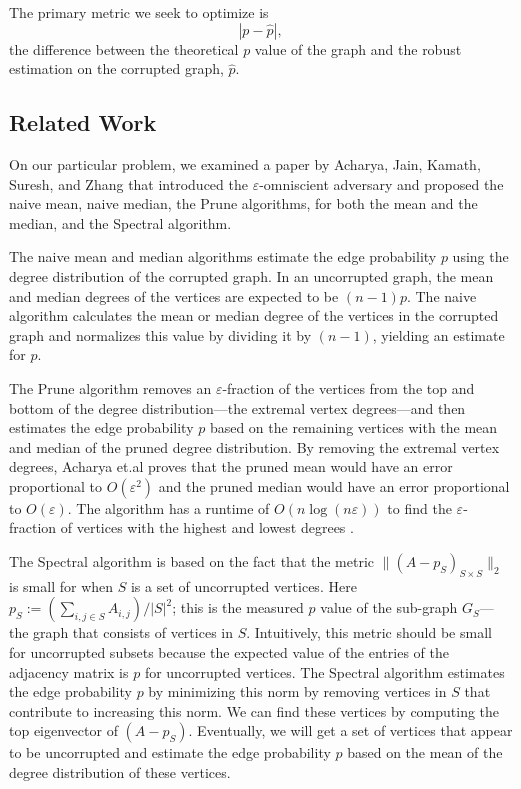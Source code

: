 \documentclass[10pt,onecolumn,letterpaper]{article}
\newcommand{\eps}{\varepsilon}
\begin{document}
The primary metric we seek to optimize is $$|p - \hat p|,$$ the difference between the theoretical $p$ value of the graph and the robust estimation on the corrupted graph, $\hat{p}$.

\subsection{Related Work}

On our particular problem, we examined a paper by Acharya, Jain, Kamath, Suresh, and Zhang \cite{acharya2022robustestimationrandomgraphs} that introduced the $\eps$-omniscient adversary and proposed the naive mean, naive median, the Prune algorithms, for both the mean and the median, and the Spectral algorithm. 

The naive mean and median algorithms estimate the edge probability $p$ using the degree distribution of the corrupted graph. In an uncorrupted graph, the mean and median degrees of the vertices are expected to be $(n-1)p$. The naive algorithm calculates the mean or median degree of the vertices in the corrupted graph and normalizes this value by dividing it by $(n-1)$, yielding an estimate for $p$.

The Prune algorithm removes an $\eps$-fraction of the vertices from the top and bottom of the degree distribution---the extremal vertex degrees---and then estimates the edge probability $p$ based on the remaining vertices with the mean and median of the pruned degree distribution. By removing the extremal vertex degrees, Acharya et.al proves that the pruned mean would have an error proportional to $O(\eps^2)$ and the pruned median would have an error proportional to $O(\eps)$. The algorithm has a runtime of $O(n \log (n\eps))$ to find the $\eps$-fraction of vertices with the highest and lowest degrees \cite{acharya2022robustestimationrandomgraphs}.

The Spectral algorithm is based on the fact that the metric \(\| (A - p_S)_{S \times S}\|_2\) is small for when \(S\) is a set of uncorrupted vertices. Here \(p_S:=(\sum_{i,j\in S}A_{i,j})/{|S|^2}\); this is the measured \(p\) value of the sub-graph \(G_S\)---the graph that consists of vertices in \(S\). Intuitively, this metric should be small for uncorrupted subsets because the expected value of the entries of the adjacency matrix is \(p\) for uncorrupted vertices. The Spectral algorithm estimates the edge probability \(p\) by minimizing this norm by removing vertices in \(S\) that contribute to increasing this norm. We can find these vertices by computing the top eigenvector of \((A - p_S)\). Eventually, we will get a set of vertices that appear to be uncorrupted and estimate the edge probability \(p\) based on the mean of the degree distribution of these vertices. 
\end{document}
